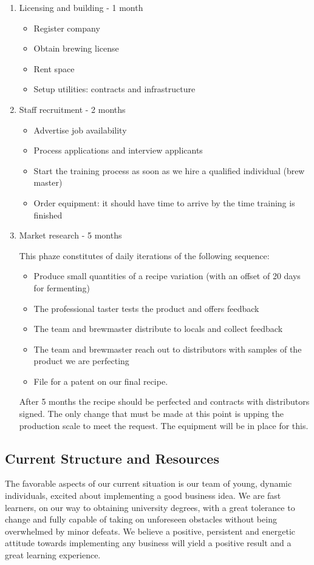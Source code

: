 \documentclass[11pt]{article}
\begin{document}
  \begin{enumerate}
  \item Licensing and building - 1 month
    \begin{itemize}
    \item Register company
    \item Obtain brewing license
    \item Rent space
    \item Setup utilities: contracts and infrastructure
    \end{itemize}

  \item Staff recruitment - 2 months
    \begin{itemize}
    \item Advertise job availability
    \item Process applications and interview applicants
    \item Start the training process as soon as we hire a qualified individual
(brew master)
    \item Order equipment: it should have time to arrive by the time training
is finished
    \end{itemize}

  \item Market research - 5 months

This phaze constitutes of daily iterations of the following sequence:
    \begin{itemize}
    \item Produce small quantities of a recipe variation (with an offset of 20
days for fermenting)
    \item The professional taster tests the product and offers feedback
    \item The team and brewmaster distribute to locals and collect feedback
    \item The team and brewmaster reach out to distributors with samples of the
product we are perfecting
    \item File for a patent on our final recipe.
    \end{itemize}
After 5 months the recipe should be perfected and contracts with distributors
signed. The only change that must be made at this point is upping the production
 scale to meet the request. The equipment will be in place for this.
  \end{enumerate}

  \subsection{Current Structure and Resources}
The favorable aspects of our current situation is our team of young, dynamic
individuals, excited about implementing a good business idea. We are fast
learners, on our way to obtaining university degrees, with a great tolerance
to change and fully capable of taking on unforeseen obstacles without being
overwhelmed by minor defeats. We believe a positive, persistent and energetic
attitude towards implementing any business will yield a positive result and a
great learning experience.
\end{document}
